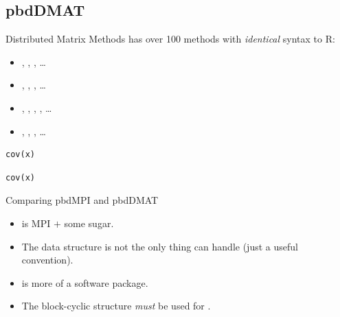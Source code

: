 \subsection{pbdDMAT}

\begin{frame}[fragile]
  \begin{block}{Distributed Matrix Methods}\pause
     has over 100 methods with \emph{identical} syntax to R:
    \begin{itemize}
     \item \code{\`{}[\`{}}, , , \dots
     \item {}, , , \dots
     \item \code{\`{}\%*\%\`{}}, , , , \dots
     \item {}, , , \dots
    \end{itemize}
\begin{lstlisting}[title=Serial Code]
cov(x)
\end{lstlisting}
  
\begin{lstlisting}[title=Parallel Code]
cov(x)
\end{lstlisting}
  \end{block}
\end{frame}

\begin{frame}[fragile]
  \begin{block}{Comparing pbdMPI and pbdDMAT}\pause
    \begin{itemize}
     \item {} is MPI $+$ some sugar.
     \item The  data structure is not the only thing  can handle (just a useful convention).
     \item {} is more of a software package.
     \item The block-cyclic  structure \emph{must} be used for .
    \end{itemize}
  \end{block}
\end{frame}

